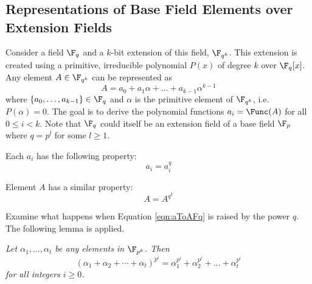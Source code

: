 \appendix
\chapter{}
\fixchapterheading
\section{Representations of Base Field Elements over Extension Fields}\label{append:Fpk}
Consider a field $\F_q$ and a $k$-bit extension of this field, $\F_{q^k}$.
This extension is created using a primitive, irreducible polynomial $P(x)$ of
degree $k$ over $\F_q[x]$.
Any element $A\in \F_{q^k}$ can be represented as
\begin{equation}
A=a_0+a_1\alpha+\dots+a_{k-1}\alpha^{k-1} \label{eqn:aToAFq}
\end{equation}
where $\{a_0,\dots,a_{k-1}\}\in\F_q$ and $\alpha$ is the primitive element of $\F_{q^k}$, i.e. 
$P(\alpha)=0$. The goal is to derive the polynomial functions $a_i=\Func(A)$ for all
$0\leq i < k$. Note that $\F_q$ could itself be an extension field of a base field $\F_p$ 
where $q=p^l$ for some $l\geq 1$.

Each $a_i$ has the following property:
\begin{equation}
a_i=a_i^{q} \label{eqn:appendixaiq}
\end{equation}

Element $A$ has a similar property:
\begin{equation}
A=A^{q^k} \label{eqn:appendixAqk}
\end{equation}

Examine what happens when Equation \ref{eqn:aToAFq} is raised by the power $q$.
The following lemma is applied.

\begin{Lemma}\label{lemma:raiseToPq}\cite{galois_field:mceliece}
{\it Let $\alpha_1, \dots, \alpha_t$ be any elements in $\F_{p^k}$. Then
\begin{equation}
(\alpha_1+\alpha_2+\cdots+\alpha_t)^{p^i}=\alpha_1^{p^i}+\alpha_2^{p^i}+\dots+\alpha_t^{p^i}
\end{equation}
for all integers $i \geq 0$. }
\end{Lemma}

